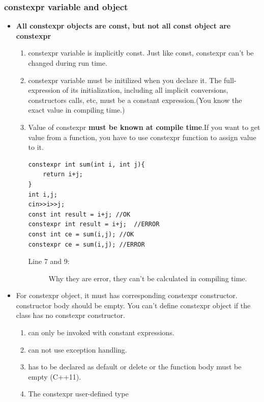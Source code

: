 \documentclass[a4paper,11pt,twoside]{book}
\begin{document}
\subsubsection{constexpr variable and object}
\begin{itemize}
	\item \textbf{All constexpr objects are const, but not all const object are constexpr}
	\begin{enumerate}
		\item constexpr variable is implicitly const. Just like const, constexpr can't be changed during run time.
		
		\item constexpr variable must be initilized when you declare it. The full-expression of its initialization, including all implicit conversions, constructors calls, etc, must be a constant expression.(You know the exact value in compiling time.)
		
		\item Value of constexpr \textbf{must be known at compile time}.If you want to get value from a function, you have to use constexpr function to assign value to it. 
		
\begin{lstlisting}
constexpr int sum(int i, int j){
	return i+j;
}
int i,j;
cin>>i>>j;
const int result = i+j; //OK
constexpr int result = i+j;  //ERROR
const int ce = sum(i,j); //OK
constexpr ce = sum(i,j); //ERROR
\end{lstlisting}
\begin{description}
	\item[Line 7 and 9:] Why they are error, they can't be calculated in compiling time.
\end{description}
		


	\end{enumerate}
	
	\item For constexpr object, it must has corresponding  constexpr constructor. constructor body should be empty. You can't define constexpr object if the class has no constexpr constructor.
	\begin{enumerate}
		\item can only be invoked with constant expressions.
		\item can not use exception handling.
		\item has to be declared as default or delete or the function body must be empty (C++11).
		\item The constexpr user-defined type
	\end{enumerate}
	

\end{itemize}
\end{document}

